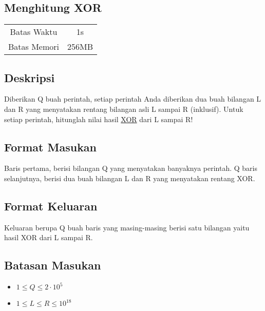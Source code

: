 \documentclass{article}
\begin{document}
\begin{center}
    \section*{Menghitung XOR} %

    \begin{tabular}{ | c c | }
        \hline
        Batas Waktu  & 1s \\    %
        Batas Memori & 256MB \\  %
        \hline
    \end{tabular}
\end{center}

\subsection*{Deskripsi}
Diberikan Q buah perintah, setiap perintah Anda diberikan dua buah bilangan L dan R yang menyatakan rentang bilangan asli L sampai R (inklusif). Untuk setiap perintah, hitunglah nilai hasil \href{https://en.wikipedia.org/wiki/Exclusive_or}{XOR} dari L sampai R!

\subsection*{Format Masukan}
Baris pertama, berisi bilangan Q yang menyatakan banyaknya perintah. Q baris selanjutnya, berisi dua buah bilangan L dan R yang menyatakan rentang XOR.

\subsection*{Format Keluaran}
Keluaran berupa Q buah baris yang masing-masing berisi satu bilangan yaitu hasil XOR dari L sampai R.

\subsection*{Batasan Masukan}
\begin{itemize}
 \item $1 \leq Q  \leq 2 \cdot 10^5$
 \item $1 \leq L  \leq R  \leq 10^{18}$
\end{itemize}
\end{document}
